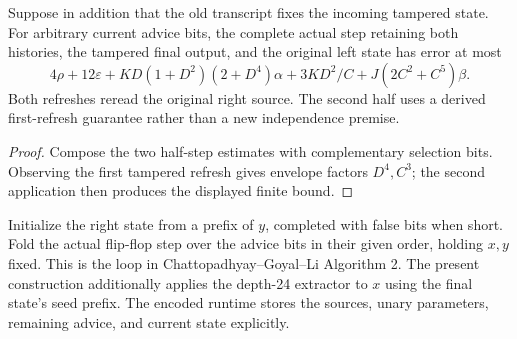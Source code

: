 \begin{theorem}
  \label{thm:lowerbounds-algebraic-flipflop-preservation-step}
  \leanok
  Suppose in addition that the old transcript fixes the incoming
  tampered state. For arbitrary current advice bits, the complete actual
  step retaining both histories, the tampered final output, and the
  original left state has error at most
  \[
    4\rho+12\varepsilon+KD(1+D^2)(2+D^4)\alpha+
      3KD^2/C+J(2C^2+C^5)\beta.
  \]
  Both refreshes reread the original right source. The second half uses
  a derived first-refresh guarantee rather than a new independence premise.
\end{theorem}
\begin{proof}
  \leanok
  Compose the two half-step estimates with complementary selection bits.
  Observing the first tampered refresh gives envelope factors $D^4,C^3$;
  the second application then produces the displayed finite bound.
\end{proof}

\begin{definition}
  \label{def:lowerbounds-algebraic-advice-program}
  \leanok
  Initialize the right state from a prefix of $y$, completed with false
  bits when short. Fold the actual flip-flop step over the advice bits
  in their given order, holding $x,y$ fixed. This is the loop in
  Chattopadhyay--Goyal--Li Algorithm 2. The present construction additionally
  applies the depth-24 extractor to $x$ using the final state's seed prefix.
  The encoded runtime stores the sources, unary parameters, remaining
  advice, and current state explicitly.
\end{definition}

